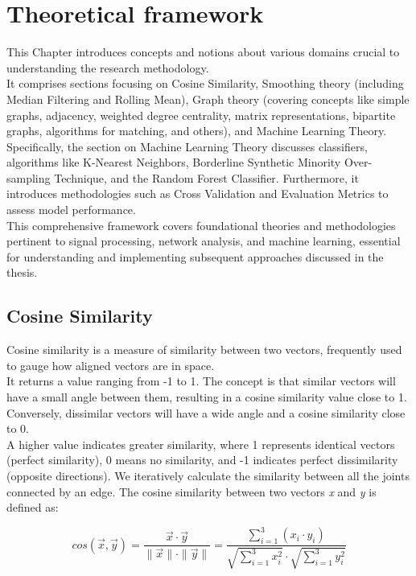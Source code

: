 \chapter{Theoretical framework}
\label{chapter:theoretical}
This Chapter introduces concepts and notions about various domains crucial to understanding the research methodology. \\
It comprises sections focusing on Cosine Similarity, Smoothing theory (including Median Filtering and Rolling Mean), Graph theory (covering concepts like simple graphs, adjacency, weighted degree centrality, matrix representations, bipartite graphs, algorithms for matching, and others), and Machine Learning Theory.\\
Specifically, the section on Machine Learning Theory discusses classifiers, algorithms like K-Nearest Neighbors, Borderline Synthetic Minority Over-sampling Technique, and the Random Forest Classifier. Furthermore, it introduces methodologies such as Cross Validation and Evaluation Metrics to assess model performance.\\
This comprehensive framework covers foundational theories and methodologies pertinent to signal processing, network analysis, and machine learning, essential for understanding and implementing subsequent approaches discussed in the thesis.

\section{Cosine Similarity}
\label{sec:cosine_sim}
Cosine similarity is a measure of similarity between two vectors, frequently used to gauge how aligned vectors are in space. \\ 
It returns a value ranging from -1 to 1. 
The concept is that similar vectors will have a small angle between them, resulting in a cosine similarity value close to 1. \\ 
Conversely, dissimilar vectors will have a wide angle and a cosine similarity close to 0.\\ 
A higher value indicates greater similarity, where 1 represents identical vectors (perfect similarity), 0 means no similarity, and -1 indicates perfect dissimilarity (opposite directions). 
We iteratively calculate the similarity between all the joints connected by an edge. 
The cosine similarity between two vectors \textit{x} and \textit{y} is defined as: 

\begin{equation}  
  cos(\vec{x}, \vec{y}) = \frac{\vec{x} \cdot \vec{y}}{\|\vec{x}\| \cdot \|\vec{y}\|}  =  \frac{\sum_{i=1}^{3} (x_i \cdot y_i)}{\sqrt{\sum_{i=1}^{3} x_i^2} \cdot \sqrt{\sum_{i=1}^{3} y_i^2}}    
\end{equation} 


